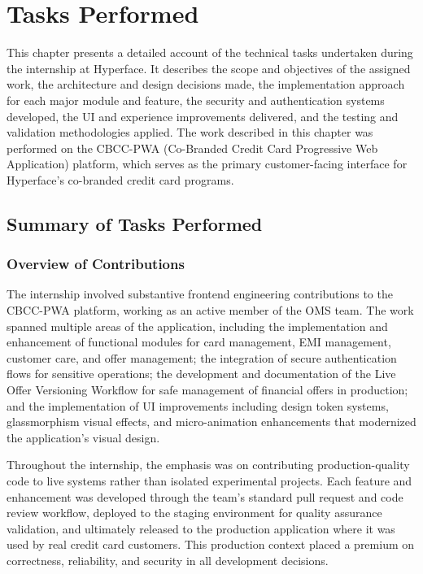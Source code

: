 \chapter{Tasks Performed}

This chapter presents a detailed account of the technical tasks undertaken during the internship at Hyperface. It describes the scope and objectives of the assigned work, the architecture and design decisions made, the implementation approach for each major module and feature, the security and authentication systems developed, the UI and experience improvements delivered, and the testing and validation methodologies applied. The work described in this chapter was performed on the CBCC-PWA (Co-Branded Credit Card Progressive Web Application) platform, which serves as the primary customer-facing interface for Hyperface's co-branded credit card programs.

\section{Summary of Tasks Performed}

\subsection{Overview of Contributions}

The internship involved substantive frontend engineering contributions to the CBCC-PWA platform, working as an active member of the OMS team. The work spanned multiple areas of the application, including the implementation and enhancement of functional modules for card management, EMI management, customer care, and offer management; the integration of secure authentication flows for sensitive operations; the development and documentation of the Live Offer Versioning Workflow for safe management of financial offers in production; and the implementation of UI improvements including design token systems, glassmorphism visual effects, and micro-animation enhancements that modernized the application's visual design.

Throughout the internship, the emphasis was on contributing production-quality code to live systems rather than isolated experimental projects. Each feature and enhancement was developed through the team's standard pull request and code review workflow, deployed to the staging environment for quality assurance validation, and ultimately released to the production application where it was used by real credit card customers. This production context placed a premium on correctness, reliability, and security in all development decisions.

